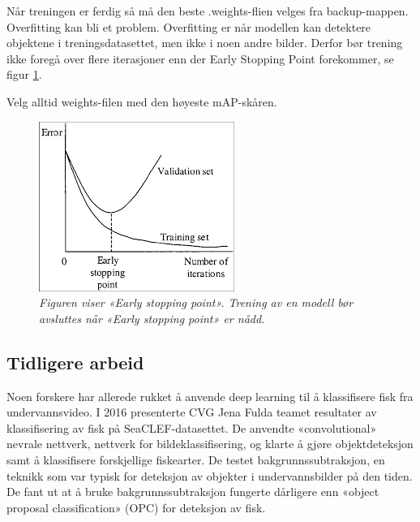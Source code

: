 Når treningen er ferdig så må den beste .weights-flien velges fra backup-mappen. Overfitting kan bli et problem. Overfitting er når modellen kan detektere objektene i treningsdatasettet, men ikke i noen andre bilder. Derfor bør trening ikke foregå over flere iterasjoner enn der Early Stopping Point forekommer, se figur \ref{fig:early_stopping_point}. \cite{Bochkovskiy 2020}

Velg alltid weights-filen med den høyeste mAP-skåren.

\begin{figure}[h]
\begin{center} 
\includegraphics[scale=1.0]{figures/early_stopping_point}
\caption{\small \sl Figuren viser «Early stopping point». Trening av en modell bør avsluttes når «Early stopping point» er nådd. \cite{Bochkovskiy 2020} \label{fig:early_stopping_point}}
\end{center}
\end{figure}

\subsection{Tidligere arbeid}

\label{part:prev_work}
Noen forskere har allerede rukket å anvende deep learning til å klassifisere fisk fra undervannsvideo. I 2016 presenterte CVG Jena Fulda teamet resultater av klassifisering av fisk på SeaCLEF-datasettet. De anvendte «convolutional» nevrale nettverk, nettverk for bildeklassifisering, og klarte å gjøre objektdeteksjon samt å klassifisere forskjellige fiskearter. De testet bakgrunnssubtraksjon, en teknikk som var typisk for deteksjon av objekter i undervannsbilder på den tiden. De fant ut at å bruke bakgrunnssubtraksjon fungerte dårligere enn «object proposal classification» (OPC) for deteksjon av fisk. \cite{Rodner m.fl. 2016}


